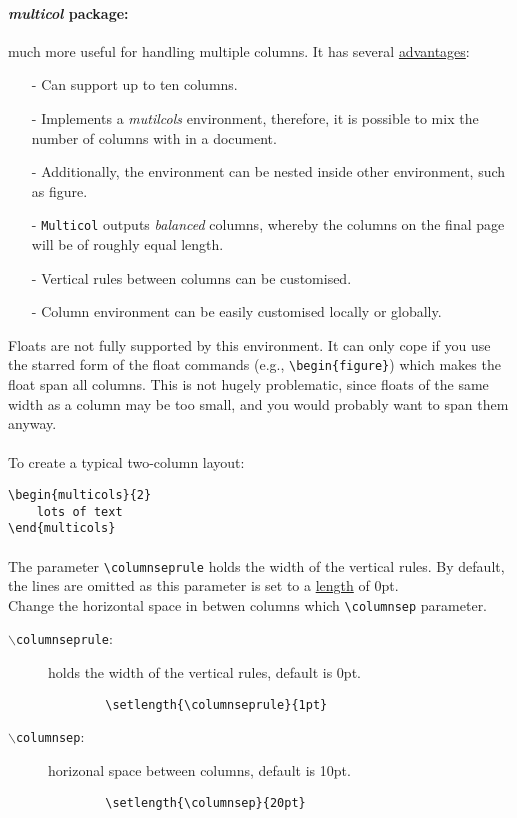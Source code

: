 \paragraph{\emph{multicol} package:}much more useful for handling multiple columns.
It has several \underline{advantages}:
\begin{itemize}
	\item[-] Can support up to ten columns.
	\item[-] Implements a \emph{mutilcols} environment, therefore, it is possible to
		mix the number of columns with in a document.
	\item[-] Additionally, the environment can be nested inside other environment, such as figure.
	\item[-] \texttt{Multicol} outputs \emph{balanced} columns, whereby the columns on the
		final page will be of roughly equal length.
	\item[-] Vertical rules between columns can be customised.
	\item[-] Column environment can be easily customised locally or globally.
\end{itemize}
Floats are not fully supported by this environment. It can only cope if you use the starred
form of the float commands (e.g., \verb|\begin{figure*}|) which makes the float span all columns.
This is not hugely problematic, since floats of the same width as a column may be too small, and
you would probably want to span them anyway.
\paragraph{}
To create a typical two-column layout:
\begin{verbatim}
\begin{multicols}{2}
	lots of text
\end{multicols}
\end{verbatim}

\paragraph{}
The parameter \verb|\columnseprule| holds the width of the vertical rules. By default, the lines
are omitted as this parameter is set to a \underline{length} of 0pt. \\
Change the horizontal space in betwen columns which \verb|\columnsep| parameter.
\begin{description}
	\item[\texttt{$\backslash$columnseprule}:] holds the width of the vertical rules, default is 0pt.
		\begin{verbatim}
		\setlength{\columnseprule}{1pt}
		\end{verbatim}
	\item[\texttt{$\backslash$columnsep}:] horizonal space between columns, default is 10pt.
		\begin{verbatim}
		\setlength{\columnsep}{20pt}
		\end{verbatim}
\end{description}

